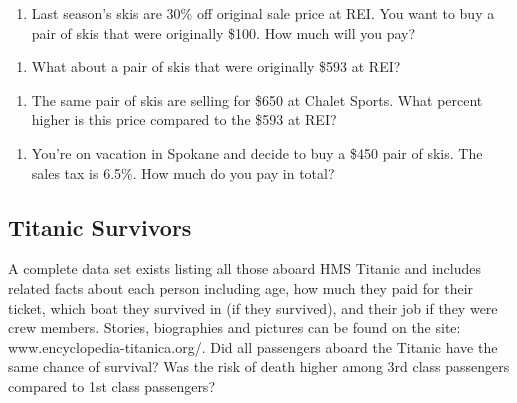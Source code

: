 \documentclass[
]{report}
\providecommand{\tightlist}{%
  \setlength{\itemsep}{0pt}\setlength{\parskip}{0pt}}
\begin{document}
\begin{enumerate}
\def\labelenumi{\arabic{enumi}.}
\tightlist
\item
  Last season's skis are 30\% off original sale price at REI. You want to buy a pair of skis that were originally \$100. How much will you pay?
\end{enumerate}

\vspace{0.5in}

\begin{enumerate}
\def\labelenumi{\arabic{enumi}.}
\setcounter{enumi}{1}
\tightlist
\item
  What about a pair of skis that were originally \$593 at REI?
\end{enumerate}

\vspace{0.5in}

\begin{enumerate}
\def\labelenumi{\arabic{enumi}.}
\setcounter{enumi}{2}
\tightlist
\item
  The same pair of skis are selling for \$650 at Chalet Sports. What percent higher is this price compared to the \$593 at REI?
\end{enumerate}

\vspace{0.5in}

\begin{enumerate}
\def\labelenumi{\arabic{enumi}.}
\setcounter{enumi}{3}
\tightlist
\item
  You're on vacation in Spokane and decide to buy a \$450 pair of skis. The sales tax is 6.5\%. How much do you pay in total?
\end{enumerate}

\vspace{0.5in}

\hypertarget{titanic-survivors}{%
\subsection{Titanic Survivors}\label{titanic-survivors}}

A complete data set exists listing all those aboard HMS Titanic and includes related facts about each person including age, how much they paid for their ticket, which boat they survived in (if they survived), and their job if they were crew members. Stories, biographies and pictures can be found on the site: www.encyclopedia-titanica.org/. Did all passengers aboard the Titanic have the same chance of survival? Was the risk of death higher among 3rd class passengers compared to 1st class passengers?
\end{document}
